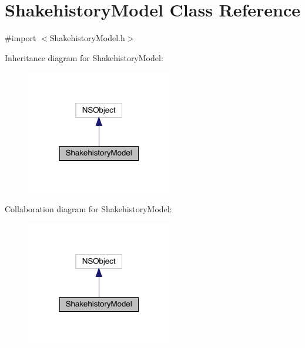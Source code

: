 \hypertarget{interface_shakehistory_model}{}\section{Shakehistory\+Model Class Reference}
\label{interface_shakehistory_model}


{\ttfamily \#import $<$Shakehistory\+Model.\+h$>$}



Inheritance diagram for Shakehistory\+Model\+:\nopagebreak
\begin{figure}[H]
\begin{center}
\leavevmode
\includegraphics[width=181pt]{interface_shakehistory_model__inherit__graph}
\end{center}
\end{figure}


Collaboration diagram for Shakehistory\+Model\+:\nopagebreak
\begin{figure}[H]
\begin{center}
\leavevmode
\includegraphics[width=181pt]{interface_shakehistory_model__coll__graph}
\end{center}
\end{figure}
